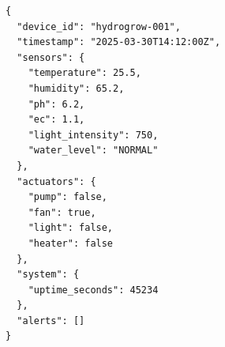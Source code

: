 \begin{lstlisting}[label=cod:esquema_json,caption=Esquema JSON que se envía al servidor.]
{
  "device_id": "hydrogrow-001",
  "timestamp": "2025-03-30T14:12:00Z",
  "sensors": {
    "temperature": 25.5,
    "humidity": 65.2,
    "ph": 6.2,
    "ec": 1.1,
    "light_intensity": 750,
    "water_level": "NORMAL"
  },
  "actuators": {
    "pump": false,
    "fan": true,
    "light": false,
    "heater": false
  },
  "system": {
    "uptime_seconds": 45234
  },
  "alerts": []
}
\end{lstlisting}

